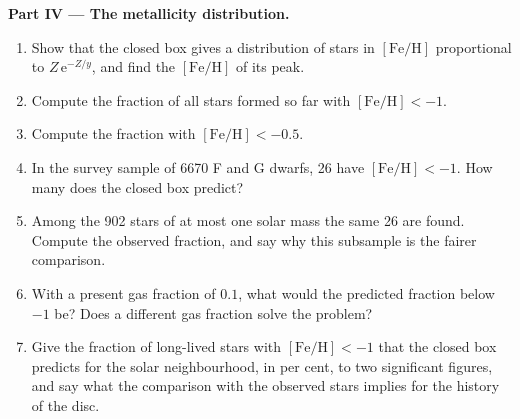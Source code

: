 \begin{problem}
\medskip\noindent\textbf{Part IV --- The metallicity distribution.}
\begin{enumerate}[resume]
\item Show that the closed box gives a distribution of stars in
  $[\mathrm{Fe/H}]$ proportional to $Z\,\mathrm{e}^{-Z/y}$, and find the
  $[\mathrm{Fe/H}]$ of its peak.
\item Compute the fraction of all stars formed so far with
  $[\mathrm{Fe/H}] < -1$.
\item Compute the fraction with $[\mathrm{Fe/H}] < -0.5$.
\item In the survey sample of 6670 F and G dwarfs, 26 have
  $[\mathrm{Fe/H}] < -1$. How many does the closed box predict?
\item Among the 902 stars of at most one solar mass the same 26 are
  found. Compute the observed fraction, and say why this subsample is
  the fairer comparison.
\item With a present gas fraction of $0.1$, what would the predicted
  fraction below $-1$ be? Does a different gas fraction solve the
  problem?
\item Give the fraction of long-lived stars with $[\mathrm{Fe/H}] < -1$
  that the closed box predicts for the solar neighbourhood, in per cent,
  to two significant figures, and say what the comparison with the
  observed stars implies for the history of the disc.
\end{enumerate}
\end{problem}
